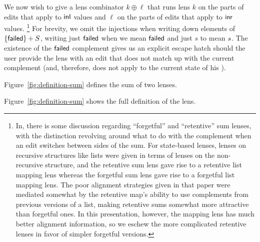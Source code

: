 We now wish to give a lens combinator $k\oplus\ell$ that runs lens $k$ on
the parts of edits that apply to $\mathsf{inl}$ values and $\ell$ on
the parts of edits that apply to $\mathsf{inr}$ values.%
\footnote{\label{footnoteseven}%
In\symmlenses, there is some discussion regarding
``forgetful'' and ``retentive'' sum lenses, with the distinction revolving
around what to do with the complement when an edit switches between sides of
the sum. For state-based lenses, lenses on recursive structures like lists
were given in terms of lenses on the non-recursive structure, and the
retentive sum lens gave rise to a retentive list mapping lens whereas the
forgetful sum lens gave rise to a forgetful list mapping lens. The poor
alignment strategies given in that paper were mediated somewhat by the
retentive map's ability to use complements from previous versions of a list,
making retentive sums somewhat more attractive than forgetful ones. In this
presentation, however, the mapping lens has much better alignment
information, so we eschew the more complicated retentive lenses in favor of
simpler forgetful versions.
}
\iffailed
For brevity, we omit the injections when writing down elements of
$\{\mathsf{failed}\}+S$, writing just $\mathsf{failed}$ when we mean $\mathsf{failed}$
and just $s$ to mean $ s$. The existence of the $\mathsf{failed}$ complement
gives us an explicit escape hatch should the user provide the lens with an
edit that does not match up with the current complement (and, therefore,
does not apply to the current state of his \replica). 
\fi
\iffull
\begin{defn}[Sum]
Figure~\ref{fig:definition-sum} defines the sum of two lenses. 
\end{defn}
\else
Figure~\ref{fig:definition-sum} shows the full definition\iffull{} of the
lens.\fi


